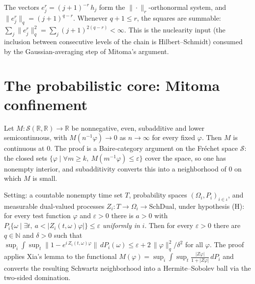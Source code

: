 \begin{lemma}\label{lem:mit-hs-summable}
  \leanok
  The vectors $e^r_j = (j+1)^{-r}\, h_j$ form the $\|\cdot\|_r$-orthonormal system, and
  $\|e^r_j\|_q = (j+1)^{q-r}$.  Whenever $q + 1 \le r$, the squares are summable:
  $\sum_j \|e^r_j\|_q^2 = \sum_j (j+1)^{2(q-r)} < \infty$.  This is the nuclearity input (the
  inclusion between consecutive levels of the chain is Hilbert--Schmidt) consumed by the
  Gaussian-averaging step of Mitoma's argument.
\end{lemma}

\section{The probabilistic core: Mitoma confinement}

\begin{lemma}\label{lem:mit-xia}
  \leanok
  Let $M : \mathcal{S}(\mathbb{R},\mathbb{R}) \to \mathbb{R}$ be nonnegative, even, subadditive and
  lower semicontinuous, with $M(n^{-1}\varphi) \to 0$ as $n \to \infty$ for every fixed $\varphi$.
  Then $M$ is continuous at $0$.  The proof is a Baire-category argument on the Fréchet space
  $\mathcal{S}$: the closed sets $\{\varphi \mid \forall m \ge k,\ M(m^{-1}\varphi) \le \varepsilon\}$
  cover the space, so one has nonempty interior, and subadditivity converts this into a
  neighborhood of $0$ on which $M$ is small.
\end{lemma}

\begin{theorem}\label{thm:mit-charfun-bound}
  \leanok
  Setting: a countable nonempty time set $T$, probability spaces $(\Omega_i, P_i)_{i \in \iota}$,
  and measurable dual-valued processes $Z_i : T \to \Omega_i \to \mathrm{SchDual}$, under hypothesis
  (H): for every test function $\varphi$ and $\varepsilon > 0$ there is $a > 0$ with
  $P_i\{\omega \mid \exists t,\ a < |Z_i(t,\omega)\varphi|\} \le \varepsilon$ \emph{uniformly in}
  $i$.  Then for every $\varepsilon > 0$ there are $q \in \mathbb{N}$ and $\delta > 0$ such that
  $\sup_i \int \sup_t \bigl\|1 - e^{i\, Z_i(t,\omega)\varphi}\bigr\|\, dP_i(\omega) \le
  \varepsilon + 2\,\|\varphi\|_q^2/\delta^2$ for all $\varphi$.  The proof applies Xia's lemma to
  the functional $M(\varphi) = \sup_i \int \sup_t \frac{|Z\varphi|}{1+|Z\varphi|}\,dP_i$ and
  converts the resulting Schwartz neighborhood into a Hermite--Sobolev ball via the two-sided
  domination.
\end{theorem}


